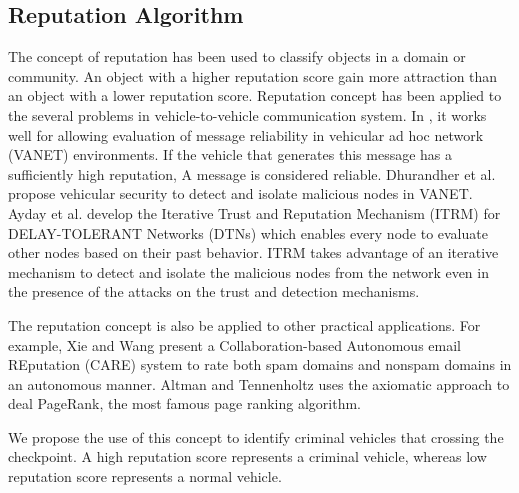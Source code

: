 \documentclass{llncs}
\begin{document}
\subsection{Reputation Algorithm}
The concept of reputation has been used to classify objects in a domain or community. 
An object with a higher reputation score gain more attraction than an object with a lower reputation score.  
Reputation concept has been applied to the several problems in vehicle-to-vehicle communication system.  
In \cite{QinLi}, it works well for allowing evaluation of message reliability in vehicular ad hoc network (VANET) environments. 
If the vehicle that generates this message has a sufficiently high reputation, A message is considered reliable.
%
Dhurandher et al. \cite{Dhurandher} propose vehicular security to detect and isolate malicious nodes in VANET.
%
Ayday et al. \cite{Ayday} develop the Iterative Trust and Reputation Mechanism (ITRM) for DELAY-TOLERANT Networks (DTNs) which enables every node to evaluate other nodes based on their past behavior.
ITRM takes advantage of an iterative mechanism to detect
and isolate the malicious nodes from the network even in the presence of the attacks on the trust and detection mechanisms.

The reputation concept is also be applied to other practical applications. For example, 
%
Xie and Wang \cite{Xie} present a Collaboration-based Autonomous email REputation (CARE) system to rate both spam domains
and nonspam domains in an autonomous manner.
Altman and Tennenholtz \cite{altman} uses the axiomatic approach to deal PageRank, the most famous page ranking algorithm.

We propose the use of this concept to identify criminal vehicles that crossing the checkpoint. 
A high reputation score represents a criminal vehicle, whereas low reputation score represents a normal vehicle.
\end{document}

